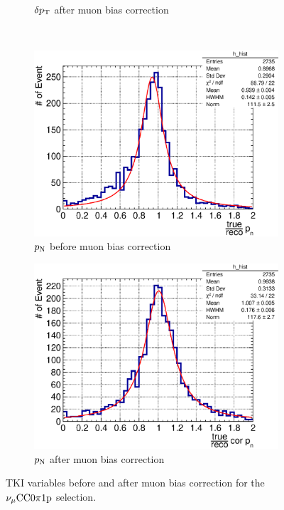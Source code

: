 \begin{figure}
\begin{subfigure}[b]{\dbfigwid\textwidth}
               \caption{$\delta p_\textrm{T}$ after muon bias correction}
               \label{subfig:esc-dpt-afmu}
          \end{subfigure}
          \\
          \begin{subfigure}[b]{\dbfigwid\textwidth}
               \centering
               \includegraphics[width=\textwidth]{figures/perf/tki/pn_rat_hist_al14.eps}
               \caption{$p_\textrm{N}$ before muon bias correction}
               \label{subfig:esc-pn-bfmu}
          \end{subfigure}
          \begin{subfigure}[b]{\dbfigwid\textwidth}
               \centering
               \includegraphics[width=\textwidth]{figures/perf/tki/cor_pn_rat_hist_al14.eps}
               \caption{$p_\textrm{N}$ after muon bias correction}
               \label{subfig:esc-pn-afmu}
          \end{subfigure}
          \caption{TKI variables before and after muon bias correction for the $\nu_{\mu}\textrm{CC}0\pi1\textrm{p}$ selection.}
          \label{fig:mc-tki-0pi-mubias}
     \end{figure}





